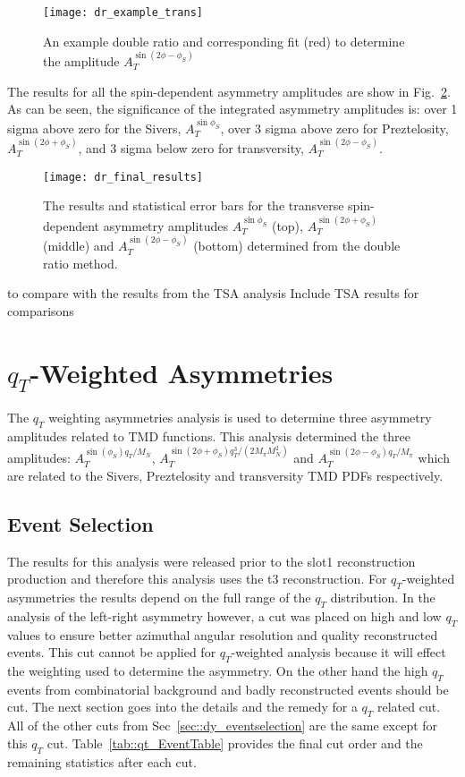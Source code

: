 \begin{figure}[h!t]
  \centering \texttt{[image: dr\_example\_trans]}
  \caption{An example double ratio and corresponding fit (red) to determine the
    amplitude $A_T^{\sin(2\phi-\phi_S)}$}
  \label{fig::dr_example_trans}
\end{figure}

\noindent
The results for all the spin-dependent asymmetry amplitudes are show in
Fig.~\ref{fig::dr_final_results}.  As can be seen, the significance of the
integrated asymmetry amplitudes is: over 1 sigma above zero for the Sivers,
$A^{\sin\phi_S}_T$, over 3 sigma above zero for Preztelosity,
$A^{\sin(2\phi+\phi_S)}_T$, and 3 sigma below zero for transversity,
$A^{\sin(2\phi-\phi_S)}_T$.

\begin{figure}[h!t]
  \centering \texttt{[image: dr\_final\_results]}
  \caption{The results and statistical error bars for the transverse
    spin-dependent asymmetry amplitudes $A^{\sin\phi_S}_T$ (top),
    $A^{\sin(2\phi+\phi_S)}_T$ (middle) and $A^{\sin(2\phi-\phi_S)}_T$ (bottom)
    determined from the double ratio method.}
  \label{fig::dr_final_results}
\end{figure}

to compare with the results from the TSA analysis
Include TSA results for comparisons


\section{$q_T$-Weighted Asymmetries} \label{sec::qtweighted}

The $q_T$ weighting asymmetries analysis is used to determine three asymmetry
amplitudes related to TMD functions.  This analysis determined the three
amplitudes: $A_T^{\sin(\phi_S) q_T/M_N}$, $A_T^{\sin(2\phi+\phi_S)
  q^3_T/(2M_{\pi}M_N^2)}$ and $A_T^{\sin(2\phi-\phi_S) q_T/M_{\pi}}$ which are
related to the Sivers, Preztelosity and transversity TMD PDFs respectively.

\subsection{Event Selection}
The results for this analysis were released prior to the slot1 reconstruction
production and therefore this analysis uses the t3 reconstruction.  For
$q_T$-weighted asymmetries the results depend on the full range of the $q_T$
distribution.  In the analysis of the left-right asymmetry however, a cut was
placed on high and low $q_T$ values to ensure better azimuthal angular
resolution and quality reconstructed events.  This cut cannot be applied for
$q_T$-weighted analysis because it will effect the weighting used to determine
the asymmetry.  On the other hand the high $q_T$ events from combinatorial
background and badly reconstructed events should be cut.  The next section goes
into the details and the remedy for a $q_T$ related cut. All of the other cuts
from Sec~\ref{sec::dy_eventselection} are the same except for this $q_T$
cut. Table~\ref{tab::qt_EventTable} provides the final cut order and the
remaining statistics after each cut.

